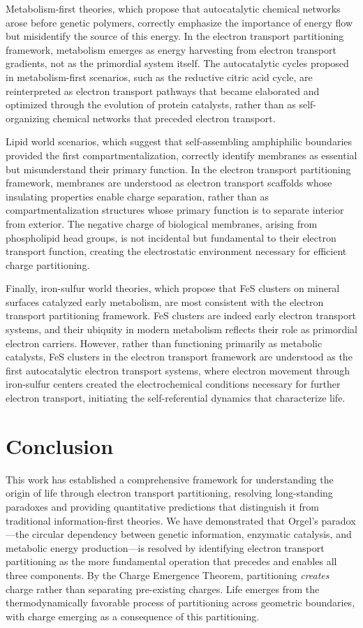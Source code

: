\documentclass[12pt,a4paper]{article}
\begin{document}
Metabolism-first theories, which propose that autocatalytic chemical networks arose before genetic polymers, correctly emphasize the importance of energy flow but misidentify the source of this energy. In the electron transport partitioning framework, metabolism emerges as energy harvesting from electron transport gradients, not as the primordial system itself. The autocatalytic cycles proposed in metabolism-first scenarios, such as the reductive citric acid cycle, are reinterpreted as electron transport pathways that became elaborated and optimized through the evolution of protein catalysts, rather than as self-organizing chemical networks that preceded electron transport.

Lipid world scenarios, which suggest that self-assembling amphiphilic boundaries provided the first compartmentalization, correctly identify membranes as essential but misunderstand their primary function. In the electron transport partitioning framework, membranes are understood as electron transport scaffolds whose insulating properties enable charge separation, rather than as compartmentalization structures whose primary function is to separate interior from exterior. The negative charge of biological membranes, arising from phospholipid head groups, is not incidental but fundamental to their electron transport function, creating the electrostatic environment necessary for efficient charge partitioning.

Finally, iron-sulfur world theories, which propose that FeS clusters on mineral surfaces catalyzed early metabolism, are most consistent with the electron transport partitioning framework. FeS clusters are indeed early electron transport systems, and their ubiquity in modern metabolism reflects their role as primordial electron carriers. However, rather than functioning primarily as metabolic catalysts, FeS clusters in the electron transport framework are understood as the first autocatalytic electron transport systems, where electron movement through iron-sulfur centers created the electrochemical conditions necessary for further electron transport, initiating the self-referential dynamics that characterize life.

\section{Conclusion}
\label{sec:conclusion}

This work has established a comprehensive framework for understanding the origin of life through electron transport partitioning, resolving long-standing paradoxes and providing quantitative predictions that distinguish it from traditional information-first theories. We have demonstrated that Orgel's paradox---the circular dependency between genetic information, enzymatic catalysis, and metabolic energy production---is resolved by identifying electron transport partitioning as the more fundamental operation that precedes and enables all three components. By the Charge Emergence Theorem, partitioning \emph{creates} charge rather than separating pre-existing charges. Life emerges from the thermodynamically favorable process of partitioning across geometric boundaries, with charge emerging as a consequence of this partitioning.
\end{document}
